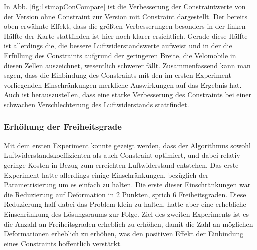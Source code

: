 In Abb. \cref{fig:1stmapConCompare} ist die Verbesserung der Constraintwerte von der Version ohne Constraint zur Version mit Constraint dargestellt.
Der bereits oben erwähnte Effekt, dass die größten Verbesserungen besonders in der linken Hälfte der Karte stattfinden ist hier noch klarer ersichtlich.
Gerade diese Hälfte ist allerdings die, die bessere Luftwiderstandswerte aufweist und in der die Erfüllung des Constraints aufgrund der geringeren Breite, die Velomobile in diesen Zellen auszeichnet, wesentlich schwerer fällt.
Zusammenfassend kann man sagen, dass die Einbindung des Constraints mit den im ersten Experiment vorliegenden Einschränkungen merkliche Auswirkungen auf das Ergebnis hat.
Auch ist herauszustellen, dass eine starke Verbesserung des Constraints bei einer schwachen Verschlechterung des Luftwiderstands stattfindet.

\subsubsection{Erhöhung der Freiheitsgrade}

Mit dem ersten Experiment konnte gezeigt werden, dass der Algorithmus sowohl Luftwiderstandskoeffizienten als auch Constraint optimiert, und dabei relativ geringe Kosten in Bezug zum erreichten Luftwiderstand entstehen.
Das erste Experiment hatte allerdings einige Einschränkungen, bezüglich der Parametrisierung um es einfach zu halten.
Die erste dieser Einschränkungen war die Reduzierung auf Deformation in 2 Punkten, sprich 6 Freiheitsgraden.
Diese Reduzierung half dabei das Problem klein zu halten, hatte aber eine erhebliche Einschränkung des Lösungsraums zur Folge.
Ziel des zweiten Experiments ist es die Anzahl an Freiheitsgraden erheblich zu erhöhen, damit die Zahl an möglichen Deformationen erheblich zu erhöhen, was den positiven Effekt der Einbindung eines Constraints hoffentlich verstärkt.

